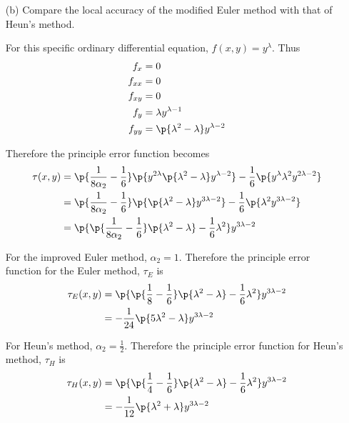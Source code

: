 \documentclass[11pt]{article}
\begin{document}
\begin{enumerate}
\begin{enumerate}
            \item[(b)]
                Compare the local accuracy of the modified Euler method with
                that of Heun's method.

                For this specific ordinary differential equation,
                $f(x, y) = y^{\lambda}$.
                Thus
                \begin{align*}
                    f_x &= 0 \\
                    f_{xx} &= 0 \\
                    f_{xy} &= 0 \\
                    f_{y} &= \lambda y^{\lambda - 1} \\
                    f_{yy} &= \p{\lambda^2 - \lambda} y^{\lambda - 2}
                \end{align*}
                

                Therefore the principle error function becomes
                \begin{align*}
                    \tau(x,y) &= \p{\frac{1}{8 \alpha_2}
                        -\frac{1}{6}}\p{y^{2\lambda} \p{\lambda^2 - \lambda}y^{\lambda - 2}}
                        -\frac{1}{6}\p{y^{\lambda} \lambda^2 y^{2\lambda - 2}} \\
                    &= \p{\frac{1}{8 \alpha_2}
                        -\frac{1}{6}}\p{\p{\lambda^2 - \lambda} y^{3\lambda - 2}}
                        -\frac{1}{6}\p{\lambda^2 y^{3\lambda - 2}} \\
                    &= \p{\p{\frac{1}{8 \alpha_2}
                        -\frac{1}{6}}\p{\lambda^2 - \lambda} - \frac{1}{6} \lambda^2} y^{3\lambda - 2}
                \end{align*}

                For the improved Euler method, $\alpha_2 = 1$.
                Therefore the principle error function for the Euler method, $\tau_E$ is
                \begin{align*}
                    \tau_E(x, y) &= \p{\p{\frac{1}{8}-\frac{1}{6}}\p{\lambda^2 - \lambda} - \frac{1}{6} \lambda^2} y^{3\lambda - 2} \\
                    &= -\frac{1}{24}\p{5\lambda^2 - \lambda} y^{3\lambda - 2} \\
                \end{align*}

                For Heun's method, $\alpha_2 = \frac{1}{2}$.
                Therefore the principle error function for Heun's method, $\tau_H$ is
                \begin{align*}
                    \tau_H(x,y) &= \p{\p{\frac{1}{4}-\frac{1}{6}}\p{\lambda^2 - \lambda} - \frac{1}{6} \lambda^2} y^{3\lambda - 2} \\
                                &= -\frac{1}{12}\p{\lambda^2 + \lambda} y^{3\lambda - 2}
                \end{align*}


\end{enumerate}
\end{enumerate}
\end{document}

